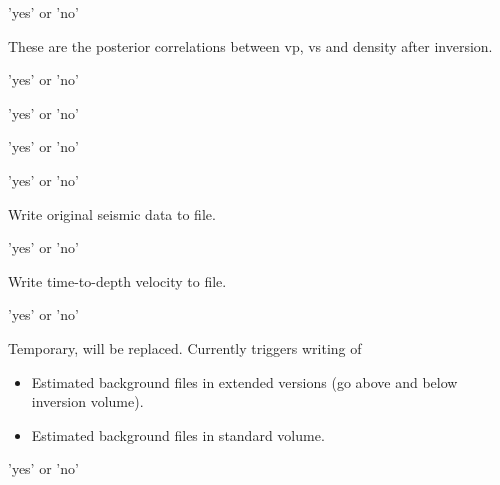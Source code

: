  \slist
   \item \Description
   \item \Argument 'yes' or 'no'
   \item \Default
\elist

 \slist
   \item \Description These are the posterior correlations between vp, vs and density after inversion.
   \item \Argument 'yes' or 'no'
   \item \Default
\elist

 \slist
   \item \Description
   \item \Argument 'yes' or 'no'
   \item \Default
\elist

 \slist
   \item \Description
   \item \Argument 'yes' or 'no'
   \item \Default
\elist

 \slist
   \item \Description
   \item \Argument 'yes' or 'no'
   \item \Default
\elist

 \slist
   \item \Description Write original seismic data to file.
   \item \Argument 'yes' or 'no'
   \item \Default
 \elist

 \slist
   \item \Description Write time-to-depth velocity to file.
   \item \Argument 'yes' or 'no'
   \item \Default
 \elist

 \slist
   \item \Description Temporary, will be replaced. Currently triggers writing of
   \begin{itemize}
   \item Estimated background files in extended versions (go above and below inversion volume).
   \item Estimated background files in standard volume.
   \end{itemize}
   \item \Argument 'yes' or 'no'
   \item \Default
\elist


